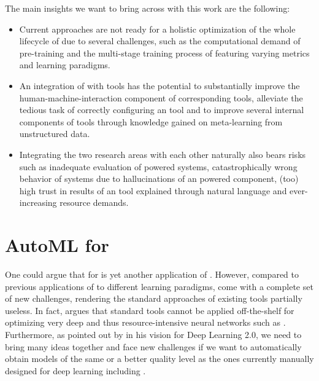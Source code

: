 The main insights we want to bring across with this work are the following: 
\begin{itemize}
    \item Current \AutoML approaches are not ready for a holistic optimization of the whole lifecycle of \LLMs due to several challenges, such as the computational demand of pre-training and the multi-stage training process of \LLMs featuring varying metrics and learning paradigms. 
    \item An integration of \LLMs with \AutoML tools has the potential to substantially improve the human-machine-interaction component of corresponding tools, alleviate the tedious task of correctly configuring an \AutoML tool and to improve several internal components of \AutoML tools through knowledge gained on meta-learning from unstructured data.
    \item Integrating the two research areas with each other naturally also bears risks such as inadequate evaluation of \LLM powered \AutoML systems, catastrophically wrong behavior of \AutoML systems due to hallucinations of an \LLM powered component, (too) high trust in results of an \AutoML tool explained through natural language and ever-increasing resource demands.
\end{itemize}

\section{AutoML for \LLMs}
\label{llm-sec:automl-for-llms}

One could argue that \AutoML for \LLMs is yet another application of \AutoML. However, compared to previous applications of \AutoML to different learning paradigms, \LLMs come with a complete set of new challenges, rendering the standard approaches of existing \AutoML tools partially useless. In fact, \citet{godbole-github23} argues that standard \HPO tools cannot be applied off-the-shelf for optimizing very deep and thus resource-intensive neural networks such as \LLMs. Furthermore, as pointed out by \cite{hutter-blog22a} in his vision for Deep Learning 2.0, we need to bring many ideas together and face new challenges if we want to automatically obtain models of the same or a better quality level as the ones currently manually designed for deep learning including \LLMs.

